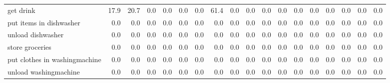 \documentclass{article}
\begin{document}
\begin{sideways}
\begin{tabular}{lrrrrrrrrrrrrrrrrr}
get drink                     &        17.9 &               20.7 &           0.0 &               0.0 &                0.0 &                0.0 &             61.4 &                      0.0 &                   0.0 &              0.0 &              0.0 &                            0.0 &                      0.0 &                    0.0 &                                  0.0 &                          0.0 &                  0.0 \\
put items in dishwasher       &         0.0 &                0.0 &           0.0 &               0.0 &                0.0 &                0.0 &              0.0 &                      0.0 &                   0.0 &              0.0 &              0.0 &                            0.0 &                      0.0 &                    0.0 &                                  0.0 &                          0.0 &                  0.0 \\
unload dishwasher             &         0.0 &                0.0 &           0.0 &               0.0 &                0.0 &                0.0 &              0.0 &                      0.0 &                   0.0 &              0.0 &              0.0 &                            0.0 &                      0.0 &                    0.0 &                                  0.0 &                          0.0 &                  0.0 \\
store groceries               &         0.0 &                0.0 &           0.0 &               0.0 &                0.0 &                0.0 &              0.0 &                      0.0 &                   0.0 &              0.0 &              0.0 &                            0.0 &                      0.0 &                    0.0 &                                  0.0 &                          0.0 &                  0.0 \\
put clothes in washingmachine &         0.0 &                0.0 &           0.0 &               0.0 &                0.0 &                0.0 &              0.0 &                      0.0 &                   0.0 &              0.0 &              0.0 &                            0.0 &                      0.0 &                    0.0 &                                  0.0 &                          0.0 &                  0.0 \\
unload washingmachine         &         0.0 &                0.0 &           0.0 &               0.0 &                0.0 &                0.0 &              0.0 &                      0.0 &                   0.0 &              0.0 &              0.0 &                            0.0 &                      0.0 &                    0.0 &                                  0.0 &                          0.0 &                  0.0 \\

\end{tabular}
\end{sideways}
\end{document}
